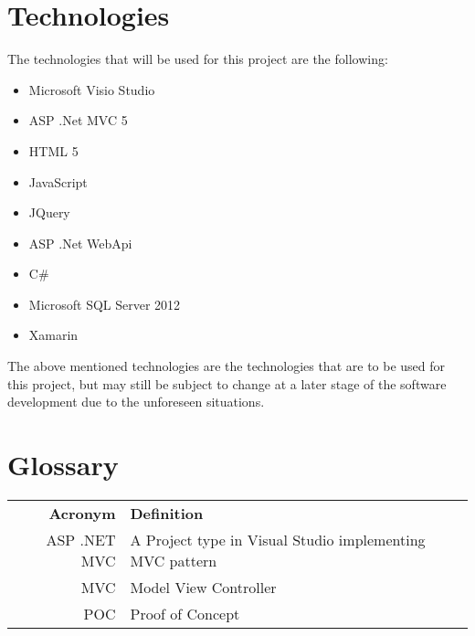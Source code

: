 \documentclass[11pt,titlepage]{article} %
\begin{document}
\section{Technologies}
The technologies that will be used  for this project are the following:
\begin{itemize}
	\item{Microsoft Visio Studio}
	\item{ASP .Net MVC 5}
	\item{HTML 5}
	\item{JavaScript}
	\item{JQuery}
	\item{ASP .Net WebApi}
	\item{C\#}
	\item{Microsoft SQL Server 2012}
	\item{Xamarin}
	\end{itemize}
The above mentioned technologies are the technologies that are to be used for this project, but may still be subject to change at a later stage of the software development due to the unforeseen situations. 
	

\newpage
\appendix
\section{Glossary} \label{App:AppendixA}
\begin{tabular}{rl}
	\textbf{Acronym} & \textbf{Definition} \\[0.5cm]
	ASP .NET MVC & A Project type in Visual Studio implementing MVC pattern \\
	MVC & Model View Controller \\
	POC & Proof of Concept
\end{tabular}
\end{document}

